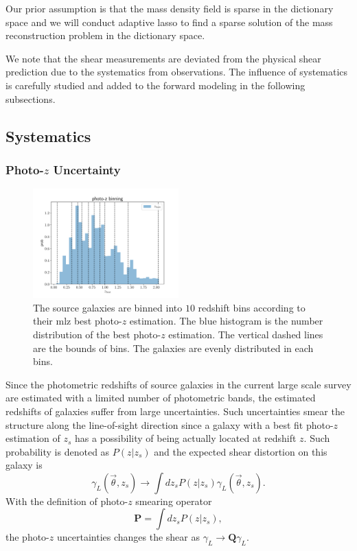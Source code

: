 \documentclass[twocolumn]{aastex62}
\begin{document}
Our prior assumption is that the mass density field is sparse in the dictionary space and we will conduct
adaptive lasso \citep{AdaLASSO-Zou2006} to find a sparse solution of the mass reconstruction problem in the
dictionary space.

We note that the shear measurements are deviated from the physical shear prediction due to the systematics
from observations. The influence of systematics is carefully studied and added to the forward modeling in the
following subsections.


\subsection{Systematics}
\label{subsec:method-Systematics}

\subsubsection{Photo-$z$ Uncertainty}
\label{subsec:method-photoz}

\begin{figure}
 \centering
 \includegraphics[width=0.5\textwidth]{photo-z_binning.pdf}
 \caption{The source galaxies are binned into $10$ redshift bins according to their mlz best photo-$z$ estimation.
        The blue histogram is the number distribution of the best photo-$z$ estimation. The vertical dashed lines
        are the bounds of bins. The galaxies are evenly distributed in each bins.}
\end{figure}

Since the photometric redshifts of source galaxies in the current large scale survey are estimated with
a limited number of photometric bands, the estimated redshifts of galaxies suffer from large uncertainties.
Such uncertainties smear the structure along the line-of-sight direction since a galaxy with a best fit photo-$z$
estimation of $z_s$ has a possibility of being actually located at redshift $z$. Such probability is denoted as $P(z|z_s)$
and the expected shear distortion on this galaxy is
\begin{equation}\label{eq-delta2gamma-poz}
\gamma_L(\vec{\theta},z_s) \rightarrow \int dz_s P(z|z_s) \gamma_L(\vec{\theta},z_s).
\end{equation}
With the definition of photo-$z$ smearing operator
\begin{equation}
\mathbf{P} = \int dz_s P(z|z_s),
\end{equation}
the photo-$z$ uncertainties changes the shear as $\gamma_L \rightarrow \mathbf{Q} \gamma_L$.
\end{document}
